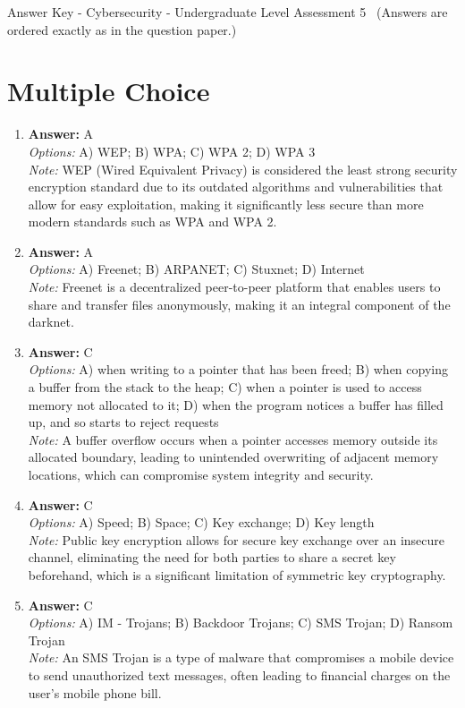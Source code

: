 \documentclass[12pt]{article}
\begin{document}
\begin{center}
Answer Key - Cybersecurity - Undergraduate Level Assessment 5 \
\small (Answers are ordered exactly as in the question paper.)
\end{center}

\section*{Multiple Choice}
\begin{enumerate}[label=\arabic*.]
\item \textbf{Answer:} A
\\ \textit{Options:} A) WEP; B) WPA; C) WPA 2; D) WPA 3
\\ \textit{Note:} WEP (Wired Equivalent Privacy) is considered the least strong security encryption standard due to its outdated algorithms and vulnerabilities that allow for easy exploitation, making it significantly less secure than more modern standards such as WPA and WPA 2.
\item \textbf{Answer:} A
\\ \textit{Options:} A) Freenet; B) ARPANET; C) Stuxnet; D) Internet
\\ \textit{Note:} Freenet is a decentralized peer-to-peer platform that enables users to share and transfer files anonymously, making it an integral component of the darknet.
\item \textbf{Answer:} C
\\ \textit{Options:} A) when writing to a pointer that has been freed; B) when copying a buffer from the stack to the heap; C) when a pointer is used to access memory not allocated to it; D) when the program notices a buffer has filled up, and so starts to reject requests
\\ \textit{Note:} A buffer overflow occurs when a pointer accesses memory outside its allocated boundary, leading to unintended overwriting of adjacent memory locations, which can compromise system integrity and security.
\item \textbf{Answer:} C
\\ \textit{Options:} A) Speed; B) Space; C) Key exchange; D) Key length
\\ \textit{Note:} Public key encryption allows for secure key exchange over an insecure channel, eliminating the need for both parties to share a secret key beforehand, which is a significant limitation of symmetric key cryptography.
\item \textbf{Answer:} C
\\ \textit{Options:} A) IM - Trojans; B) Backdoor Trojans; C) SMS Trojan; D) Ransom Trojan
\\ \textit{Note:} An SMS Trojan is a type of malware that compromises a mobile device to send unauthorized text messages, often leading to financial charges on the user's mobile phone bill.
\end{enumerate}
\end{document}
